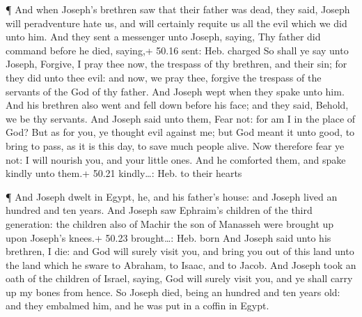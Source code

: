  ¶ And when Joseph's brethren saw that their father was
dead, they said, Joseph will peradventure hate us, and will certainly
requite us all the evil which we did unto him.  And they
sent a messenger unto Joseph, saying, Thy father did command before he
died, saying,+ 50.16 sent: Heb. charged  So shall ye say
unto Joseph, Forgive, I pray thee now, the trespass of thy brethren, and
their sin; for they did unto thee evil: and now, we pray thee, forgive
the trespass of the servants of the God of thy father. And Joseph wept
when they spake unto him.  And his brethren also went and
fell down before his face; and they said, Behold, we be thy servants.
 And Joseph said unto them, Fear not: for am I in the place
of God?  But as for you, ye thought evil against me; but
God meant it unto good, to bring to pass, as it is this day, to save
much people alive.  Now therefore fear ye not: I will
nourish you, and your little ones. And he comforted them, and spake
kindly unto them.+ 50.21 kindly\ldots: Heb. to their hearts

 ¶ And Joseph dwelt in Egypt, he, and his father's house:
and Joseph lived an hundred and ten years.  And Joseph saw
Ephraim's children of the third generation: the children also of Machir
the son of Manasseh were brought up upon Joseph's knees.+ 50.23
brought\ldots: Heb. born  And Joseph said unto his
brethren, I die: and God will surely visit you, and bring you out of
this land unto the land which he sware to Abraham, to Isaac, and to
Jacob.  And Joseph took an oath of the children of Israel,
saying, God will surely visit you, and ye shall carry up my bones from
hence.  So Joseph died, being an hundred and ten years old:
and they embalmed him, and he was put in a coffin in Egypt.
